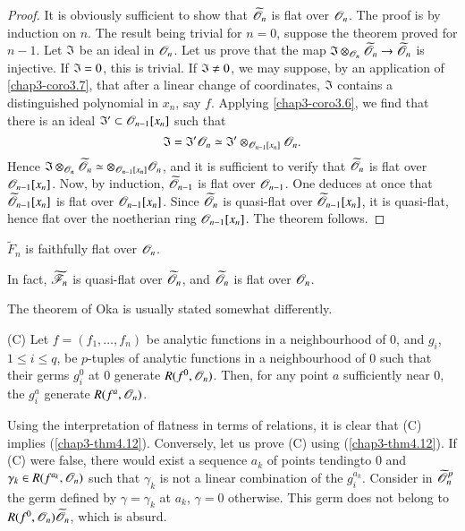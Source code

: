 \begin{proof}
It is obviously sufficient to show that $\widetilde{\mathscr{O}}_{n}$ is flat over $\mathscr{O}_{n}$. The proof is by induction on $n$. The result being trivial for $n=0$, suppose the theorem proved for $n-1$. Let $\mathfrak{I}$ be an ideal in $\mathscr{O}_{n}$. Let us prove that the map $\mathfrak{I}\otimes_{\mathscr{O}_{n}}\widetilde{\mathscr{O}}_{n}\to \widetilde{\mathscr{O}}_{n}$ is injective. If $\mathfrak{I}=0$, this is trivial. If $\mathfrak{I}\neq 0$, we may suppose, by an application of \ref{chap3-coro3.7}, that after a linear change of coordinates, $\mathfrak{I}$ contains a distinguished polynomial in $x_{n}$, say $f$. Applying \ref{chap3-coro3.6}, we find that there is an ideal $\mathfrak{I}'\subset\mathscr{O}_{n-1}[x_{n}]$ such that
$$
\mathfrak{I}=\mathfrak{I}'\mathscr{O}_{n}\simeq \mathfrak{I}'\otimes_{\mathscr{O}_{n-1}[x_{n}]}\mathscr{O}_{n}.
$$
Hence $\mathfrak{I}\otimes_{\mathscr{O}_{n}}\widetilde{\mathscr{O}}_{n}\simeq \otimes_{\mathscr{O}_{n-1}[x_{n}]}\mathscr{O}_{n}$, and it is sufficient to verify that $\widetilde{\mathscr{O}}_{n}$ is flat over $\mathscr{O}_{n-1}[x_{n}]$. Now, by induction, $\widetilde{\mathscr{O}}_{n-1}$ is flat over $\mathscr{O}_{n-1}$. One deduces at once that $\widetilde{\mathscr{O}}_{n-1}[x_{n}]$ is flat over $\mathscr{O}_{n-1}[x_{n}]$. Since $\widetilde{\mathscr{O}}_{n}$ is quasi-flat over $\widetilde{\mathscr{O}}_{n-1}[x_{n}]$, it is quasi-flat, hence flat over the noetherian ring $\mathscr{O}_{n-1}[x_{n}]$. The theorem follows.
\end{proof}

\begin{corollary}\label{chap3-coro4.13}
$\widetilde{F}_{n}$ is faithfully flat over $\mathscr{O}_{n}$.
\end{corollary}

In fact, $\widetilde{\mathscr{F}}_{n}$ is quasi-flat over $\widetilde{\mathscr{O}}_{n}$, and $\widetilde{\mathscr{O}}_{n}$ is flat over $\mathscr{O}_{n}$.

\begin{remark}\label{chap3-rem4.14}
The theorem of Oka is usually stated somewhat differently.
\end{remark}

(C) Let $f=(f_{1},\ldots,f_{n})$ be analytic functions in a neighbourhood of $0$, and $g_{i}$, $1\leq i\leq q$, be $p$-tuples of analytic functions in a neighbourhood of $0$ such that their germs $g^{0}_{i}$ at $0$ generate $R(f^{0},\mathscr{O}_{n})$. Then, for any point $a$ sufficiently near $0$, the $g^{a}_{i}$ generate $R(f^{a},\mathscr{O}_{n})$.

Using the interpretation of flatness in terms of relations, it is clear that (C) implies (\ref{chap3-thm4.12}). Conversely, let us prove (C) using (\ref{chap3-thm4.12}). If (C) were false, there would exist a sequence $a_{k}$ of points tending\pageoriginale to $0$ and $\gamma_{k}\in R(f^{a_{k}},\mathscr{O}_{n})$ such that $\gamma_{k}$ is not a linear combination of the $g^{a_{k}}_{i}$. Consider in $\widetilde{\mathscr{O}}^{p}_{n}$ the germ defined by $\gamma=\gamma_{k}$ at $a_{k}$, $\gamma=0$ otherwise. This germ does not belong to $R(f^{0},\mathscr{O}_{n})\widetilde{\mathscr{O}}_{n}$, which is absurd.

